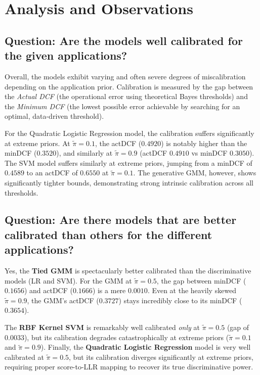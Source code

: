 \section{Analysis and Observations}

\subsection*{Question: Are the models well calibrated for the given applications?}

Overall, the models exhibit varying and often severe degrees of miscalibration depending on the application prior. Calibration is measured by the gap between the \textit{Actual DCF} (the operational error using theoretical Bayes thresholds) and the \textit{Minimum DCF} (the lowest possible error achievable by searching for an optimal, data-driven threshold).

For the Quadratic Logistic Regression model, the calibration suffers significantly at extreme priors. At $\tilde{\pi}=0.1$, the actDCF ($0.4920$) is notably higher than the minDCF ($0.3520$), and similarly at $\tilde{\pi}=0.9$ (actDCF $0.4910$ vs minDCF $0.3050$). The SVM model suffers similarly at extreme priors, jumping from a minDCF of $0.4589$ to an actDCF of $0.6550$ at $\tilde{\pi}=0.1$. The generative GMM, however, shows significantly tighter bounds, demonstrating strong intrinsic calibration across all thresholds.

\subsection*{Question: Are there models that are better calibrated than others for the different applications?}

Yes, the \textbf{Tied GMM} is spectacularly better calibrated than the discriminative models (LR and SVM). For the GMM at $\tilde{\pi}=0.5$, the gap between minDCF ($0.1656$) and actDCF ($0.1666$) is a mere $0.0010$. Even at the heavily skewed $\tilde{\pi}=0.9$, the GMM's actDCF ($0.3727$) stays incredibly close to its minDCF ($0.3654$).

The \textbf{RBF Kernel SVM} is remarkably well calibrated \textit{only} at $\tilde{\pi}=0.5$ (gap of $0.0033$), but its calibration degrades catastrophically at extreme priors ($\tilde{\pi}=0.1$ and $\tilde{\pi}=0.9$). Finally, the \textbf{Quadratic Logistic Regression} model is very well calibrated at $\tilde{\pi}=0.5$, but its calibration diverges significantly at extreme priors, requiring proper score-to-LLR mapping to recover its true discriminative power.


